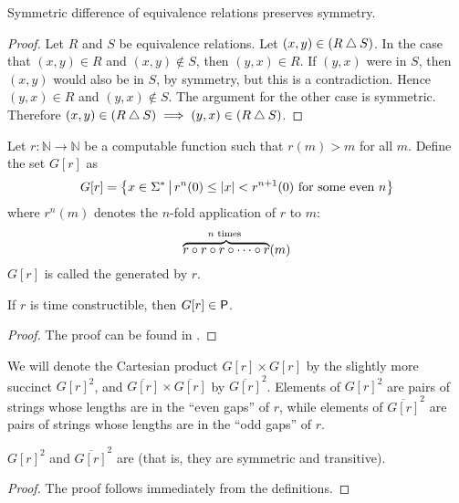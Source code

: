 \begin{proposition}\label{prop:symdiff}
  Symmetric difference of equivalence relations preserves symmetry.
\end{proposition}
\begin{proof}
  Let $R$ and $S$ be equivalence relations.
  Let $(x,y)\in(R\symdiff S)$.
  In the case that $(x,y)\in R$ and $(x,y)\notin S$, then $(y,x)\in R$.
  If $(y,x)$ were in $S$, then $(x,y)$ would also be in $S$, by symmetry, but this is a contradiction.
  Hence $(y,x)\in R$ and $(y,x)\notin S$.
  The argument for the other case is symmetric.
  Therefore $(x,y)\in(R\symdiff S)\implies (y,x)\in(R\symdiff S)$.
\end{proof}

\begin{definition}
  Let $r\colon\mathbb{N}\to\mathbb{N}$ be a computable function such that $r(m)>m$ for all $m$.
  Define the set $G[r]$ as
  \begin{displaymath}
    G[r]=\lb x\in\Sigma^* \st r^n(0)\leq|x|<r^{n+1}(0) \plain{for some even} n\rb
  \end{displaymath}
  where $r^n(m)$ denotes the $n$-fold application of $r$ to $m$:
  \begin{displaymath}
    \overbrace{r\circ r\circ r\circ\cdots\circ r}^{n \plain{times}}(m)
  \end{displaymath}
  $G[r]$ is called the  generated by $r$.
\end{definition}

\begin{lemma}\label{lem:gap_p}
  If $r$ is time constructible, then $G[r]\in\P$.
\end{lemma}
\begin{proof}
  The proof can be found in \autocite{bdg95}.
\end{proof}

We will denote the Cartesian product $G[r]\times G[r]$ by the slightly more succinct ${G[r]}^2$, and $\overline{G[r]}\times\overline{G[r]}$ by $\overline{G[r]}^2$.
Elements of ${G[r]}^2$ are pairs of strings whose lengths are in the ``even gaps'' of $r$, while elements of $\overline{G[r]}^2$ are pairs of strings whose lengths are in the ``odd gaps'' of $r$.

\begin{lemma}
  ${G[r]}^2$ and $\overline{G[r]}^2$ are  (that is, they are symmetric and transitive).
\end{lemma}
\begin{proof}
  The proof follows immediately from the definitions.
\end{proof}

